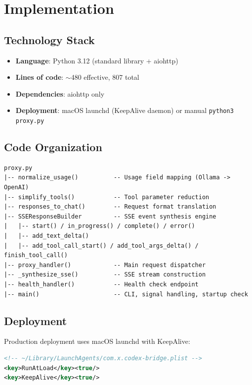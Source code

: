 \documentclass[11pt,a4paper]{article}
\begin{document}
\section{Implementation}

\subsection{Technology Stack}

\begin{itemize}[nosep]
  \item \textbf{Language}: Python 3.12 (standard library + aiohttp)
  \item \textbf{Lines of code}: $\sim$480 effective, 807 total
  \item \textbf{Dependencies}: aiohttp only
  \item \textbf{Deployment}: macOS launchd (KeepAlive daemon) or manual
        \texttt{python3 proxy.py}
\end{itemize}

\subsection{Code Organization}

\begin{lstlisting}
proxy.py
|-- normalize_usage()          -- Usage field mapping (Ollama -> OpenAI)
|-- simplify_tools()           -- Tool parameter reduction
|-- responses_to_chat()        -- Request format translation
|-- SSEResponseBuilder         -- SSE event synthesis engine
|   |-- start() / in_progress() / complete() / error()
|   |-- add_text_delta()
|   |-- add_tool_call_start() / add_tool_args_delta() / finish_tool_call()
|-- proxy_handler()            -- Main request dispatcher
|-- _synthesize_sse()          -- SSE stream construction
|-- health_handler()           -- Health check endpoint
|-- main()                     -- CLI, signal handling, startup check
\end{lstlisting}

\subsection{Deployment}

Production deployment uses macOS launchd with KeepAlive:

\begin{lstlisting}[language=XML]
<!-- ~/Library/LaunchAgents/com.x.codex-bridge.plist -->
<key>RunAtLoad</key><true/>
<key>KeepAlive</key><true/>
\end{lstlisting}
\end{document}
